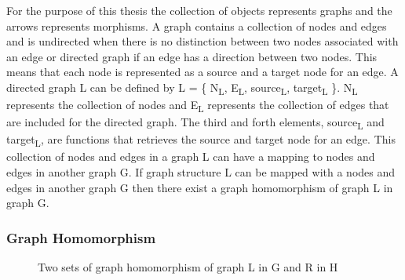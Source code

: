 For the purpose of this thesis the collection of objects represents graphs and
the arrows represents morphisms. A graph contains a collection of nodes and
edges and is undirected when there is no distinction between two nodes
associated with an edge or directed graph if an edge has a direction
between two nodes. This means that each node is represented as a source and a
target node for an edge. A directed graph L can be defined by L = \{
N\textsubscript{L}, E\textsubscript{L}, source\textsubscript{L},
target\textsubscript{L} \}. N\textsubscript{L} represents the collection of
nodes and E\textsubscript{L} represents the collection of edges that are
included for the directed graph. The third and forth elements,
source\textsubscript{L} and target\textsubscript{L}, are functions that
retrieves the source and target node for an edge. This collection of nodes and
edges in a graph L can have a mapping to nodes and edges in another graph G.
If graph structure L can be mapped with a nodes and edges in another graph G
then there exist a graph homomorphism of graph L in graph G.

\subsubsection*{Graph Homomorphism}

\begin{figure}[H]
	\centering
	\caption[Basic concepts of graph homomorphism]
	{Two sets of graph homomorphism of graph L in G and R in H}
	\label{fig:graphHomomorphism}
\end{figure}

